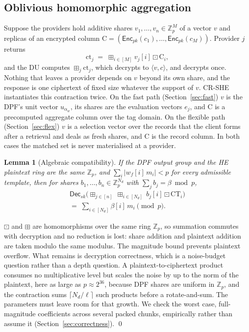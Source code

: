 \documentclass[a4paper,fleqn]{cas-sc}
\newtheorem{lemma}{Lemma}
\newcommand{\Dec}{\mathsf{Dec}}
\newcommand{\Enc}{\mathsf{Enc}}
\newcommand{\bplus}{\boxplus}
\newcommand{\bdot}{\boxdot}
\begin{document}
\subsection{Oblivious homomorphic aggregation}
\label{sec:oha}
Suppose the providers hold additive shares $v_1,\dots,v_n\in\mathbb{Z}_p^{M}$
of a vector $v$ and replicas of an encrypted column
$\mathrm{C}=(\Enc_{pk}(c_1),\dots,\Enc_{pk}(c_M))$. Provider $j$ returns
\[
\text{ct}_j \;=\; \bplus_{i\in[M]} v_j[i]\bdot \mathrm{C}_i ,
\]
and the DU computes $\bplus_j \text{ct}_j$, which decrypts to
$\langle v,c\rangle$, and decrypts once. Nothing that leaves a provider depends
on $v$ beyond its own share, and the response is one ciphertext of fixed size
whatever the support of $v$. CR-SHE instantiates this contraction twice. On the
fast path (Section~\ref{sec:fast}) $v$ is the DPF's unit vector $u_{\alpha_w}$,
its shares are the evaluation vectors $e_j$, and $\mathrm{C}$ is a precomputed
aggregate column over the tag domain. On the flexible path
(Section~\ref{sec:flex}) $v$ is a selection vector over the records that the
client forms after a retrieval and deals as fresh shares, and $\mathrm{C}$ is
the record column. In both cases the matched set is never materialised at a
provider.

\begin{lemma}[Algebraic compatibility]
\label{lem:compat}
If the DPF output group and the HE plaintext ring are the same $\mathbb{Z}_p$,
and $\sum_{i}|w_f[i]\,m_i| < p$ for every admissible template, then for shares
$b_1,\dots,b_n\in\mathbb{Z}_p^{N_d}$ with $\sum_j b_j = \beta \bmod p$,
\begin{multline*}
\Dec_{sk}\Big(\bplus_{j\in[n]}\ \bplus_{i\in[N_d]}\ b_j[i]\bdot
\text{CT}_i\Big)\\
=\; \sum_{i\in[N_d]} \beta[i]\,m_i \pmod p .
\end{multline*}
\end{lemma}
\begin{pf}
$\bdot$ and $\bplus$ are homomorphisms over the same ring $\mathbb{Z}_p$, so
summation commutes with decryption and no reduction is lost: share addition
and plaintext addition are taken modulo the same modulus. The magnitude bound
prevents plaintext overflow. What remains is decryption correctness, which is
a noise-budget question rather than a depth question. A
plaintext-to-ciphertext product consumes no multiplicative level but scales
the noise by up to the norm of the plaintext, here as large as
$p\approx2^{36}$, because DPF shares are uniform in $\mathbb{Z}_p$, and the
contraction sums $\lceil N_d/\ell\rceil$ such products before a
rotate-and-sum. The parameters must leave room for that growth. We check the
worst case, full-magnitude coefficients across several packed chunks,
empirically rather than assume it (Section~\ref{sec:correctness}). \qed
\end{pf}
\end{document}
